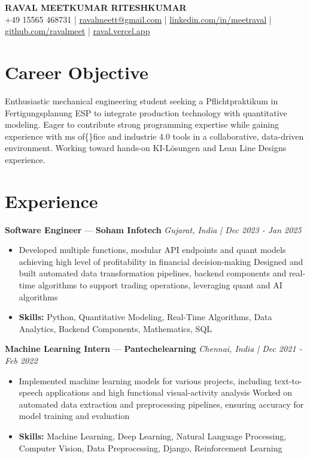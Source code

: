 \documentclass[a4paper,10pt]{article}
\begin{document}
\begin{center}
  {\Large\bfseries RAVAL MEETKUMAR RITESHKUMAR}\\[2pt]
  {\small +49 15565 468731 \;|\; \href{mailto:ravalmeett@gmail.com}{ravalmeett@gmail.com} \;|\; \href{https://www.linkedin.com/in/meetraval/}{linkedin.com/in/meetraval} \;|\; \href{https://github.com/ravalmeet}{github.com/ravalmeet} \;|\; \href{https://raval.vercel.app/}{raval.vercel.app}}
\end{center}
\vspace{-3pt}

\section*{Career Objective}
Enthusiastic mechanical engineering student seeking a Pflichtpraktikum in Fertigungsplanung ESP to integrate production technology with quantitative modeling. Eager to contribute strong programming expertise while gaining experience with ms of\{\}fice and industrie 4.0 tools in a collaborative, data-driven environment. Working toward hands-on KI-Lösungen and Lean Line Designs experience.\par

\section*{Experience}
\textbf{Software Engineer} — \textbf{Soham Infotech} \hfill \textit{Gujarat, India \;|\; Dec 2023 - Jan 2025}\par
\vspace{1pt}
\begin{itemize}
  \item Developed multiple functions, modular API endpoints and quant models achieving high level of profitability in financial decision-making Designed and built automated data transformation pipelines, backend components and real-time algorithms to support trading operations, leveraging quant and AI algorithms
  \item \textbf{Skills:} Python, Quantitative Modeling, Real-Time Algorithms, Data Analytics, Backend Components, Mathematics, SQL
\end{itemize}
\vspace{3pt}
\textbf{Machine Learning Intern} — \textbf{Pantechelearning} \hfill \textit{Chennai, India \;|\; Dec 2021 - Feb 2022}\par
\vspace{1pt}
\begin{itemize}
  \item Implemented machine learning models for various projects, including text-to-speech applications and high functional visual-activity analysis Worked on automated data extraction and preprocessing pipelines, ensuring accuracy for model training and evaluation
  \item \textbf{Skills:} Machine Learning, Deep Learning, Natural Language Processing, Computer Vision, Data Preprocessing, Django, Reinforcement Learning
\end{itemize}
\end{document}
